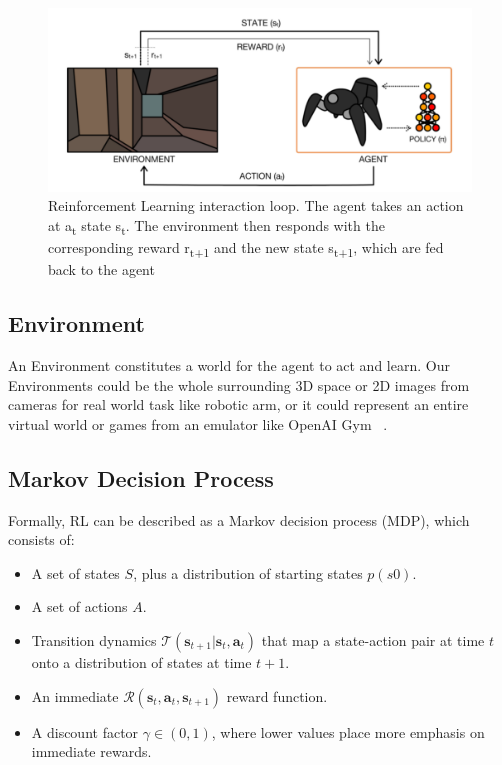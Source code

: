 \begin{figure}
	\begin{center}
		\includegraphics[width=.5\linewidth]{figures/Agent-Env.png}
		\caption{Reinforcement Learning interaction loop. The agent takes an action at a\textsubscript{t} state s\textsubscript{t}. The environment then responds with the corresponding reward r\textsubscript{t+1} and the new state s\textsubscript{t+1}, which are fed back to the agent \parencite{arulkumaran2017brief}}
		\label{fig:Agent_Env}
	\end{center}
\end{figure}

\subsection{Environment} \label{Environment}
An Environment constitutes a world for the agent to act and learn. Our Environments could be the whole surrounding 3D space or 2D images from cameras for real world task like robotic arm, or it could represent an entire virtual world or games from an emulator like OpenAI Gym ~\parencite{brockman2016openai}.


\subsection{Markov Decision Process}
Formally, RL can be described as a Markov decision process (MDP), which consists of:

\begin{itemize}
	\item A set of states \(S\), plus a distribution of starting states \(p(s0)\).
	\item A set of actions \(A\).
	\item Transition dynamics $ \mathcal{T}\left(\mathbf{s}_{t+1} | \mathbf{s}_{t}, \mathbf{a}_{t}\right) $ that map a state-action pair at time \(t\) onto a distribution of states at time \(t+1\).
	\item An immediate $ \mathcal{R}\left(\mathbf{s}_{t}, \mathbf{a}_{t}, \mathbf{s}_{t+1}\right) $ reward function.
	\item A discount factor \(\gamma \in(0,1)\), where lower values place more emphasis on immediate rewards.
\end{itemize}

